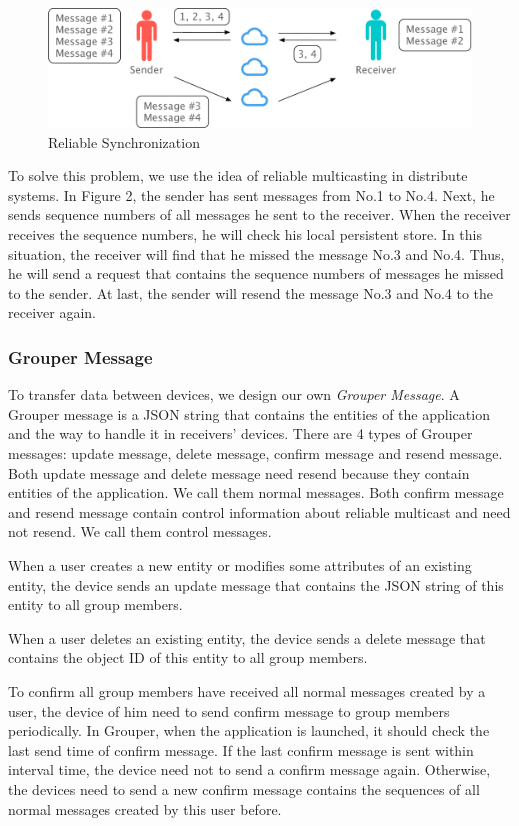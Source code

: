 \documentclass[twocolumn,10pt]{article}
\begin{document}
\begin{figure}[t]
	\centering
	\includegraphics[scale=0.3]{reliable_sync}
	\caption{Reliable Synchronization}
\end{figure}

To solve this problem, we use the idea of reliable multicasting in distribute systems. In Figure 2, the sender has sent messages from No.1 to No.4. Next, he sends sequence numbers of all messages he sent to the receiver. When the receiver receives the sequence numbers, he will check his local persistent store. In this situation, the receiver will find that he missed the message No.3 and No.4. Thus, he will send a request that contains the sequence numbers of messages he missed to the sender. At last, the sender will resend the message No.3 and No.4 to the receiver again.

\subsubsection{Grouper Message}

To transfer data between devices, we design our own \emph{Grouper Message}. A Grouper message is a JSON string that contains the entities of the application and the way to handle it in receivers’ devices. There are 4 types of Grouper messages: update message, delete message, confirm message and resend message. Both update message and delete message need resend because they contain entities of the application. We call them normal messages. Both confirm message and resend message contain control information about reliable multicast and need not resend. We call them control messages.

When a user creates a new entity or modifies some attributes of an existing entity, the device sends an update message that contains the JSON string of this entity to all group members.

When a user deletes an existing entity, the device sends a delete message that contains the object ID of this entity to all group members.

To confirm all group members have received all normal messages created by a user, the device of him need to send confirm message to group members periodically. In Grouper, when the application is launched, it should check the last send time of confirm message. If the last confirm message is sent within interval time, the device need not to send a confirm message again. Otherwise, the devices need to send a new confirm message contains the sequences of all normal messages created by this user before.
\end{document}
